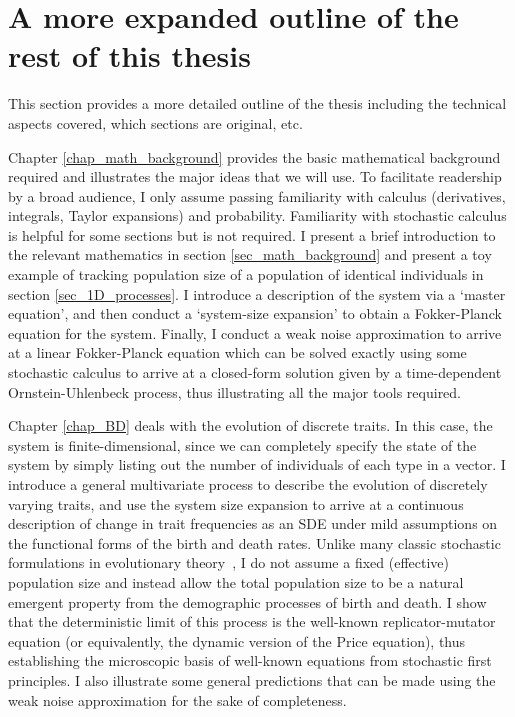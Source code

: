\section{A more expanded outline of the rest of this thesis}

This section provides a more detailed outline of the thesis including the technical aspects covered, which sections are original, etc.

Chapter \ref{chap_math_background} provides the basic mathematical background required and illustrates the major ideas that we will use. To facilitate readership by a broad audience, I only assume passing familiarity with calculus (derivatives, integrals, Taylor expansions) and probability. Familiarity with stochastic calculus is helpful for some sections but is not required. I present a brief introduction to the relevant mathematics in section \ref{sec_math_background} and present a toy example of tracking population size of a population of identical individuals in section \ref{sec_1D_processes}. I introduce a description of the system via a `master equation', and then conduct a `system-size expansion' to obtain a Fokker-Planck equation for the system. Finally, I conduct a weak noise approximation to arrive at a linear Fokker-Planck equation which can be solved exactly using some stochastic calculus to arrive at a closed-form solution given by a time-dependent Ornstein-Uhlenbeck process, thus illustrating all the major tools required.

Chapter \ref{chap_BD} deals with the evolution of discrete traits. In this case, the system is finite-dimensional, since we can completely specify the state of the system by simply listing out the number of individuals of each type in a vector. I introduce a general multivariate process to describe the evolution of discretely varying traits, and use the system size expansion to arrive at a continuous description of change in trait frequencies as an SDE under mild assumptions on the functional forms of the birth and death rates. Unlike many classic stochastic formulations in evolutionary theory~\citep{fisher_genetical_1930,wright_evolution_1931,moran_random_1958,crow_introduction_1970, lande_natural_1976,kimura_probability_1974}, I do not assume a fixed (effective) population size and instead allow the total population size to be a natural emergent property from the demographic processes of birth and death. I show that the deterministic limit of this process is the well-known replicator-mutator equation (or equivalently, the dynamic version of the Price equation), thus establishing the microscopic basis of well-known equations from stochastic first principles. I also illustrate some general predictions that can be made using the weak noise approximation for the sake of completeness.

